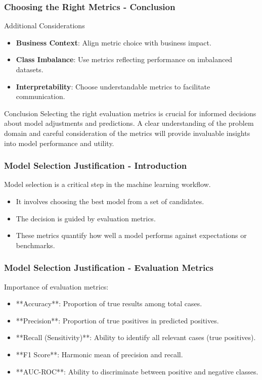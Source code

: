 \documentclass[aspectratio=169]{beamer}
\begin{document}
\begin{frame}[fragile]
    \frametitle{Choosing the Right Metrics - Conclusion}
    \begin{block}{Additional Considerations}
        \begin{itemize}
            \item \textbf{Business Context}: Align metric choice with business impact.
            \item \textbf{Class Imbalance}: Use metrics reflecting performance on imbalanced datasets.
            \item \textbf{Interpretability}: Choose understandable metrics to facilitate communication.
        \end{itemize}
    \end{block}
    
    \begin{block}{Conclusion}
        Selecting the right evaluation metrics is crucial for informed decisions about model adjustments and predictions. A clear understanding of the problem domain and careful consideration of the metrics will provide invaluable insights into model performance and utility.
    \end{block}
\end{frame}

\begin{frame}[fragile]
    \frametitle{Model Selection Justification - Introduction}
    Model selection is a critical step in the machine learning workflow. 
    \begin{itemize}
        \item It involves choosing the best model from a set of candidates.
        \item The decision is guided by evaluation metrics.
        \item These metrics quantify how well a model performs against expectations or benchmarks.
    \end{itemize}
\end{frame}

\begin{frame}[fragile]
    \frametitle{Model Selection Justification - Evaluation Metrics}
    Importance of evaluation metrics:
    \begin{itemize}
        \item **Accuracy**: Proportion of true results among total cases.
        \item **Precision**: Proportion of true positives in predicted positives.
        \item **Recall (Sensitivity)**: Ability to identify all relevant cases (true positives).
        \item **F1 Score**: Harmonic mean of precision and recall.
        \item **AUC-ROC**: Ability to discriminate between positive and negative classes.
    \end{itemize}
\end{frame}
\end{document}
